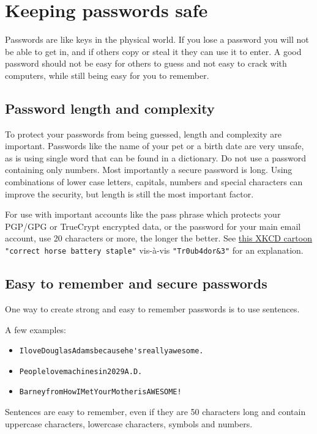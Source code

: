 \section{Keeping passwords safe}

Passwords are like keys in the physical world. If you lose a password
you will not be able to get in, and if others copy or steal it they can
use it to enter. A good password should not be easy for others to guess
and not easy to crack with computers, while still being easy for you to
remember.

\subsection{Password length and complexity}

To protect your passwords from being guessed, length and complexity are
important. Passwords like the name of your pet or a birth date are very
unsafe, as is using single word that can be found in a dictionary. Do
not use a password containing only numbers. Most importantly a secure
password is long. Using combinations of lower case letters, capitals,
numbers and special characters can improve the security, but length is
still the most important factor.

For use with important accounts like the pass phrase which protects your
PGP/GPG or TrueCrypt encrypted data, or the password for your main email
account, use 20 characters or more, the longer the better. See
\href{https://xkcd.com/936/}{this XKCD cartoon}
\verb!"correct horse battery staple"! vis-à-vis \verb!"Tr0ub4dor&3"! for
an explanation.

\subsection{Easy to remember and secure passwords}

One way to create strong and easy to remember passwords is to use
sentences.

A few examples:

\begin{itemize}
\item
  \verb!IloveDouglasAdamsbecausehe'sreallyawesome.!
\item
  \verb!Peoplelovemachinesin2029A.D.!
\item
  \verb"BarneyfromHowIMetYourMotherisAWESOME!"
\end{itemize}
Sentences are easy to remember, even if they are 50 characters long and
contain uppercase characters, lowercase characters, symbols and numbers.

